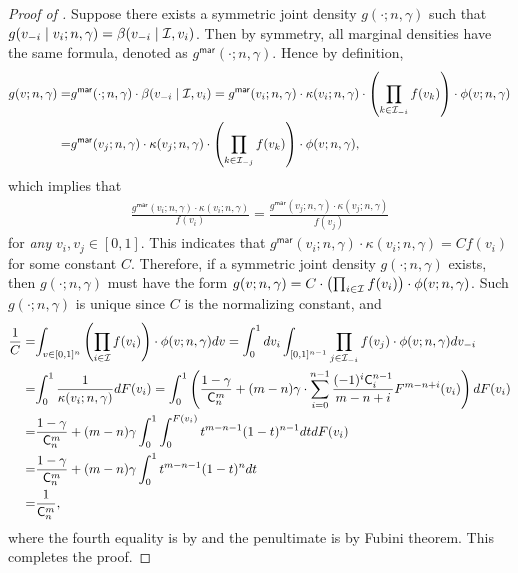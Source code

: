 \begin{proof}[{Proof of }]
Suppose there exists a symmetric joint density $g(\cdot;n,\gamma)$ such that $g(v_{-i}\mid v_i;n,\gamma) = \beta(v_{-i}\mid \mathcal{I}, v_i)$. Then by symmetry, all marginal densities have the same formula, denoted as $g^{\mathsf{mar}}(\cdot;n,\gamma)$. Hence by definition,
\begin{align*}
 g(v;n,\gamma) =& g^{\mathsf{mar}}(\cdot;n,\gamma)\cdot \beta(v_{-i}\mid \mathcal{I}, v_i) =  g^{\mathsf{mar}}(v_i;n,\gamma)\cdot
\kappa(v_i;n,\gamma)
 \cdot 
\left(\prod_{k\in \mathcal{I}_{-i}} f(v_k)\right)
 \cdot 
 \phi(v;n,\gamma)\\
 =& g^{\mathsf{mar}}(v_j;n,\gamma)\cdot
\kappa(v_j;n,\gamma)
 \cdot 
\left(\prod_{k\in \mathcal{I}_{-j}} f(v_k)\right)
 \cdot 
 \phi(v;n,\gamma),
\end{align*}
which implies that 
\begin{align*}
\frac{g^{\mathsf{mar}}(v_i;n,\gamma)\cdot
\kappa(v_i;n,\gamma)}{f(v_i)} = \frac{g^{\mathsf{mar}}(v_j;n,\gamma)\cdot
\kappa(v_j;n,\gamma)}{f(v_j)}
\end{align*}
for \textit{any} $v_i,v_j\in[0,1]$.
This indicates that $g^{\mathsf{mar}}(v_i;n,\gamma)\cdot
\kappa(v_i;n,\gamma) = Cf(v_i)$ for some constant $C$. Therefore, if a symmetric joint density $g(\cdot;n,\gamma)$ exists, then $g(\cdot;n,\gamma)$ must have the form $g(v;n,\gamma) = C \cdot \left( \prod_{i\in\mathcal{I}} f(v_i)\right)
 \cdot 
 \phi(v;n,\gamma)$. Such $g(\cdot;n,\gamma)$ is unique since $C$ is the normalizing constant, and
 \begin{align*}
    \frac{1}{C} =& {\int_{v\in [0,1]^n}\left( \prod_{i\in\mathcal{I}} f(v_i)\right)
 \cdot 
 \phi(v;n,\gamma)dv} ={\int_0^1dv_i \int_{[0,1]^{n-1}} \prod_{j\in\mathcal{I}_{-i}} f(v_j)
 \cdot 
\phi(v;n,\gamma)dv_{-i}}\\
=& {\int_0^1 \frac{1}{\kappa(v_i;n,\gamma)}dF(v_i)}
=\int_0^1 \left( \frac{1-\gamma}{\mathsf{C}^m_n} + (m-n)\gamma \cdot \sum_{i=0}^{n-1}\frac{(-1)^i\mathsf{C}^{n-1}_i}{m-n+i} F^{m-n+i}(v_i)\right) dF(v_i)\\
=& \frac{1-\gamma}{\mathsf{C}^m_n} + (m-n)\gamma\int_0^1 \int_0^{F(v_i)}t^{m-n-1}(1-t)^{n-1}dt dF(v_i)\\
=& \frac{1-\gamma}{\mathsf{C}^m_n} + (m-n)\gamma \int_0^1 t^{m-n-1}(1-t)^{n}dt \\
=& \frac{1}{\mathsf{C}^m_n},
 \end{align*}
where the fourth equality is by  and the penultimate is by Fubini theorem. This completes the proof.
\end{proof}


